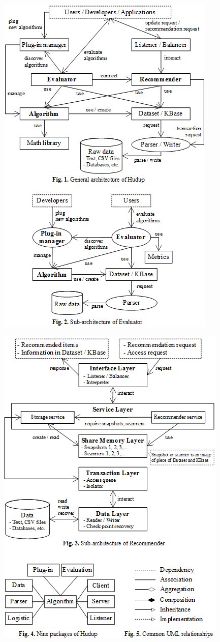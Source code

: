 \documentclass[a4paper]{llncs}
\begin{document}
\begin{figure}
\centering
\includegraphics{MultiFigures-1.png}
\end{figure}

\begin{figure}
\centering
\includegraphics{MultiFigures-2.png}
\end{figure}
\end{document}
